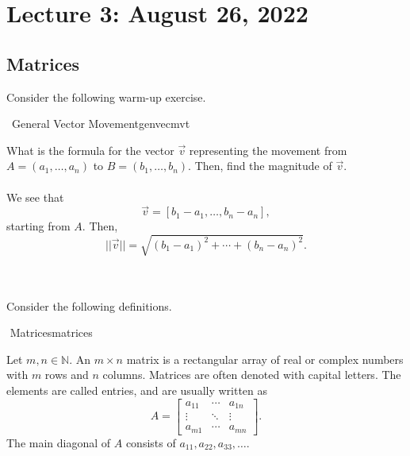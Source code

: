 \pagebreak

\section{Lecture 3: August 26, 2022}

    \subsection{Matrices}

        Consider the following warm-up exercise.
        \begin{example}{\Difficulty\,\Difficulty\,\,General Vector Movement}{genvecmvt}

            What is the formula for the vector \(\vec{v}\) representing the movement from \(A=(a_1,\ldots,a_n)\) to \(B=(b_1,\ldots,b_n)\). Then, find the magnitude of \(\vec{v}\).
            \\
            \\
            We see that
            \begin{equation*}
                \vec{v}=[b_1-a_1,\ldots,b_n-a_n],
            \end{equation*}
            starting from \(A\). Then,
            \begin{equation*}
                ||\vec{v}||=\sqrt{(b_1-a_1)^2+\cdots+(b_n-a_n)^2}.
            \end{equation*}
        
        \end{example}
        \vphantom
        \\
        \\
        Consider the following definitions.
        \begin{definition}{\Stop\,\,Matrices}{matrices}
        
            Let \(m,n\in\mathbb{N}\). An \(m\times n\) matrix is a rectangular array of real or complex numbers with \(m\) rows and \(n\) columns. Matrices are often denoted with capital letters. The elements are called entries, and are usually written as
            \begin{equation*}
                A=\begin{bmatrix} a_{11} & \cdots & a_{1n} \\ \vdots & \ddots & \vdots \\ a_{m1} & \cdots & a_{mn} \end{bmatrix}.
            \end{equation*}
            The main diagonal of \(A\) consists of \(a_{11},a_{22},a_{33},\ldots\).
        
        \end{definition}
